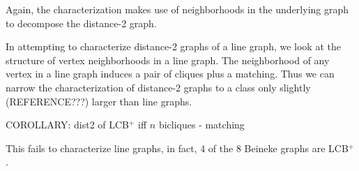 Again, the characterization makes use of neighborhoods in the underlying graph to decompose the distance-2 graph.  

In attempting to characterize distance-2 graphs of a line graph, we look at the structure of vertex neighborhoods in a line graph.  The neighborhood of any vertex in a line graph induces a pair of cliques plus a matching.  Thus we can narrow the characterization of distance-2 graphs to a class only slightly (REFERENCE???) larger than line graphs.

COROLLARY: dist2 of LCB$^+$ iff $n$ bicliques - matching

This fails to characterize line graphs, in fact, 4 of the 8 Beineke graphs are LCB$^+$.    

%
